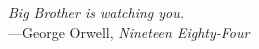 \clearpage
\vspace*{\fill} %
\begin{flushright}
	\textit{Big Brother is watching you.} \\[1em]
	---George Orwell, \textit{Nineteen Eighty-Four}
\end{flushright}
